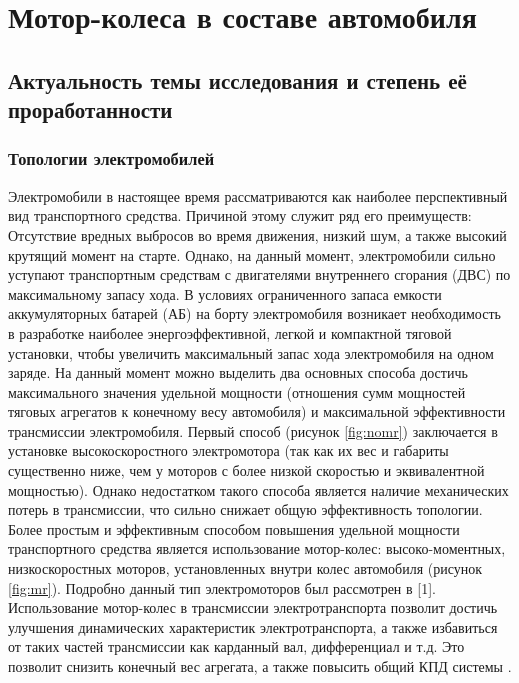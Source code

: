 \chapter{Мотор-колеса в составе автомобиля} \label{ch:ch1}

\section{Актуальность темы исследования и степень её проработанности} \label{sec:ch1/sec1}
\subsection{Топологии электромобилей}

Электромобили в настоящее время рассматриваются как наиболее перспективный вид транспортного средства. Причиной этому служит ряд его преимуществ: Отсутствие вредных выбросов во время движения, низкий шум, а также высокий крутящий момент на старте. Однако, на данный момент, электромобили сильно уступают транспортным средствам с двигателями внутреннего сгорания (ДВС) по максимальному запасу хода. В условиях ограниченного запаса емкости аккумуляторных батарей (АБ) на борту электромобиля возникает необходимость в разработке наиболее энергоэффективной, легкой и компактной тяговой установки, чтобы увеличить максимальный запас хода электромобиля на одном заряде. 
На данный момент можно выделить два основных способа достичь максимального значения удельной мощности (отношения сумм мощностей тяговых агрегатов к конечному весу автомобиля) и максимальной эффективности трансмиссии электромобиля. Первый способ (рисунок \ref{fig:nomr}) заключается в установке высокоскоростного электромотора (так как их вес и габариты существенно ниже, чем у моторов с более низкой скоростью и эквивалентной мощностью). Однако недостатком такого способа является наличие механических потерь в трансмиссии, что сильно снижает общую эффективность топологии.
Более простым и эффективным способом повышения удельной мощности транспортного средства является использование мотор-колес: высоко-моментных, низкоскоростных моторов, установленных внутри колес автомобиля (рисунок \ref{fig:mr}). Подробно данный тип электромоторов был рассмотрен в \cite{1Luque}[1]. Использование мотор-колес в трансмиссии электротранспорта позволит достичь улучшения динамических характеристик электротранспорта, а также избавиться от таких частей трансмиссии как карданный вал, дифференциал и т.д. Это позволит снизить конечный вес агрегата, а также повысить общий КПД системы \cite{2KingJetTseng,3Lovatt}.

